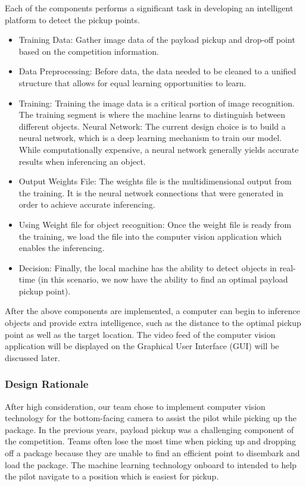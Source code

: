 \documentclass[onecolumn, draftclsnofoot, 10pt, compsoc]{IEEEtran}
\begin{document}
Each of the components performs a significant task in developing an intelligent platform to detect the pickup points.
\begin{itemize}
    \item Training Data: Gather image data of the payload pickup and drop-off point based on the competition information.
    \item Data Preprocessing: Before data, the data needed to be cleaned to a unified structure that allows for equal learning opportunities to learn.
    \item Training: Training the image data is a critical portion of image recognition. The training segment is where the machine learns to distinguish between different objects.
    \subitem Neural Network: The current design choice is to build a neural network, which is a deep learning mechanism to train our model. While computationally expensive, a neural network generally yields accurate results when inferencing an object.
    \item Output Weights File: The weights file is the multidimensional output from the training. It is the neural network connections that were generated in order to achieve accurate inferencing.
    \item Using Weight file for object recognition: Once the weight file is ready from the training, we load the file into the computer vision application which enables the inferencing.
    \item Decision: Finally, the local machine has the ability to detect objects in real-time (in this scenario, we now have the ability to find an optimal payload pickup point).
\end{itemize}

After the above components are implemented, a computer can begin to inference objects and provide extra intelligence, such as the distance to the optimal pickup point as well as the target location. The video feed of the computer vision application will be displayed on the Graphical User Interface (GUI) will be discussed later.

\subsubsection{Design Rationale}
After high consideration, our team chose to implement computer vision technology for the bottom-facing camera to assist the pilot while picking up the package. In the previous years, payload pickup was a challenging component of the competition. Teams often lose the most time when picking up and dropping off a package because they are unable to find an efficient point to disembark and load the package. The machine learning technology onboard to intended to help the pilot navigate to a position which is easiest for pickup.
\end{document}
